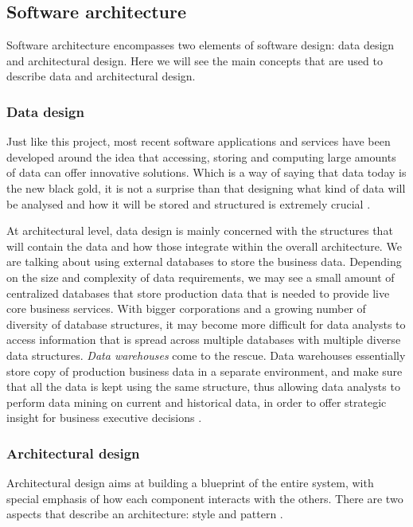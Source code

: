 \subsection{Software architecture}
Software architecture encompasses two elements of software design: data design
and architectural design. Here we will see the main concepts that are used to
describe data and architectural design.

\subsubsection{Data design}
Just like this project, most recent software applications and services have been
developed around the idea that accessing, storing and computing large amounts of
data can offer innovative solutions. Which is a way of saying that data today is
the new black gold, it is not a surprise than that designing what kind of data
will be analysed and how it will be stored and structured is extremely crucial
\cite{RP05}.

At architectural level, data design is mainly concerned with the structures that
will contain the data and how those integrate within the overall architecture.
We are talking about using external databases to store the business data.
Depending on the size and complexity of data requirements, we may see a small
amount of centralized databases that store production data that is needed to
provide live core business services. With bigger corporations and a growing
number of diversity of database structures, it may become more difficult for
data analysts to access information that is spread across multiple databases
with multiple diverse data structures. \emph{Data warehouses} come to the
rescue. Data warehouses essentially store copy of production business data in a
separate environment, and make sure that all the data is kept using the same
structure, thus allowing data analysts to perform data mining on current and
historical data, in order to offer strategic insight for business
executive decisions \cite{RM96}.

\subsubsection{Architectural design}
Architectural design aims at building a blueprint of the entire system, with
special emphasis of how each component interacts with the others. There are two
aspects that describe an architecture: style and pattern \cite{RP05}.

